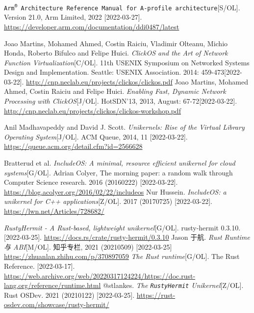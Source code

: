 \documentclass[UTF8,fontset=none,linespread=1.15]{ctexart}
\begin{document}
\begin{thebibliography}{99}
 \texttt{Arm\textsuperscript{®} Architecture Reference Manual
for A-profile architecture}[S/OL]. Version 21.0, Arm Limited, 2022 [2022-03-27]. \url{https://developer.arm.com/documentation/ddi0487/latest}

 Joao Martins, Mohamed Ahmed, Costin Raiciu, Vladimir Olteanu,
Michio Honda, Roberto Bifulco and Felipe Huici. \textit{ClickOS and the Art of Network Function Virtualization}[C/OL]. 11th USENIX Symposium on Networked Systems
Design and Implementation. Seattle: USENIX Association. 2014: 459-473[2022-03-22]. \url{http://cnp.neclab.eu/projects/clickos/clickos.pdf}
 Joao Martins, Mohamed Ahmed, Costin Raiciu and Felipe Huici.
\textit{Enabling Fast, Dynamic Network Processing with ClickOS}[J/OL]. HotSDN'13, 2013, August: 67-72[2022-03-22]. \url{http://cnp.neclab.eu/projects/clickos/clickos-workshop.pdf}

 Anil Madhavapeddy and David J. Scott. \textit{Unikernels: Rise of the Virtual Library Operating System}[J/OL]. ACM Queue, 2014, 11 [2022-03-22].  \url{https://queue.acm.org/detail.cfm?id=2566628}

  Bratterud et al. \textit{IncludeOS: A minimal, resource efficient unikernel for cloud systems}[G/OL]. Adrian Colyer, The morning paper: a random walk through Computer Science research. 2016 (20160222) [2022-03-22]. \url{https://blog.acolyer.org/2016/02/22/includeos}
 Nur Hussein. \textit{IncludeOS: a unikernel for C++ applications}[Z/OL]. 2017 (20170725) [2022-03-22]. \url{https://lwn.net/Articles/728682/}

 \textit{RustyHermit - A Rust-based, lightweight unikernel}[G/OL]. rusty-hermit 0.3.10. [2022-03-25]. \url{https://docs.rs/crate/rusty-hermit/0.3.10}
 Jason 于航. \textit{Rust Runtime 与 ABI}[M/OL]. 知乎专栏, 2021 (20210509) [2022-03-25] \url{https://zhuanlan.zhihu.com/p/370897059}
 \textit{The Rust runtime}[G/OL]. The Rust Reference. [2022-03-17].
\url{https://web.archive.org/web/20220317124224/https://doc.rust-lang.org/reference/runtime.html}
 @stlankes. \textit{The \texttt{RustyHermit} Unikernel}[Z/OL]. Rust OSDev. 2021 (20210122) [2022-03-25]. \url{https://rust-osdev.com/showcase/rusty-hermit/}


\end{thebibliography}
\end{document}
